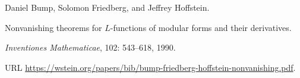 Daniel Bump, Solomon Friedberg, and Jeffrey Hoffstein.

\newblock Nonvanishing theorems for {$L$}-functions of modular forms and their derivatives.

\newblock \emph{Inventiones Mathematicae}, 102: 543--618, 1990.

\newblock URL \url{https://wstein.org/papers/bib/bump-friedberg-hoffstein-nonvanishing.pdf}.

